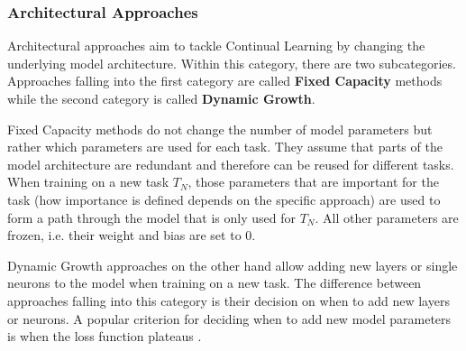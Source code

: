 \subsubsection{Architectural Approaches}
\label{sec:ArchitecturalApproaches}
Architectural approaches aim to tackle Continual Learning by changing the underlying model architecture. Within this category, there are two  
subcategories. Approaches falling into the first category are called \textbf{Fixed Capacity} methods while the second category is called
\textbf{Dynamic Growth}. \par
Fixed Capacity methods do not change the number of model parameters but rather which parameters are used for each task. They assume that parts of
the model architecture are redundant and therefore can be reused for different tasks. When training on a new task $T_N$, those parameters that are
important for the task (how importance is defined depends on the specific approach) are used to form a path through the model that is only used for
$T_N$. All other parameters are frozen, i.e. their weight and bias are set to 0. \par
Dynamic Growth approaches on the other hand allow adding new layers or single neurons to the model when training on a new task. The difference between
approaches falling into this category is their decision on when to add new layers or neurons. A popular criterion for deciding when to add new model
parameters is when the loss function plateaus \cite{ash1989dynamic}.

